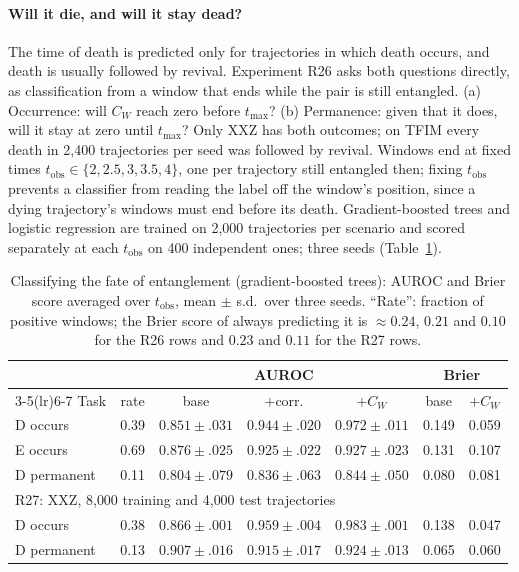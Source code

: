 \documentclass[twocolumn,10pt]{article}
\begin{document}
\paragraph{Will it die, and will it stay dead?}
The time of death is predicted only for trajectories in which death
occurs, and death is usually followed by revival. Experiment R26 asks
both questions directly, as classification from a window that ends while
the pair is still entangled. (a) Occurrence: will $C_W$ reach zero before
$t_\mathrm{max}$? (b) Permanence: given that it does, will it stay at zero
until $t_\mathrm{max}$? Only XXZ has both outcomes; on TFIM every death in
2{,}400 trajectories per seed was followed by revival. Windows end at fixed
times $t_\mathrm{obs} \in \{2, 2.5, 3, 3.5, 4\}$, one per trajectory still
entangled then; fixing $t_\mathrm{obs}$ prevents a classifier from reading
the label off the window's position, since a dying trajectory's windows
must end before its death. Gradient-boosted trees and logistic regression
are trained on 2{,}000 trajectories per scenario and scored separately at
each $t_\mathrm{obs}$ on 400 independent ones; three seeds
(Table~\ref{tab:r26}).

\begin{table}[h]
\centering
\caption{Classifying the fate of entanglement (gradient-boosted trees):
  AUROC and Brier score averaged over $t_\mathrm{obs}$, mean $\pm$ s.d.\
  over three seeds. ``Rate'': fraction of positive windows; the Brier
  score of always predicting it is $\approx 0.24$, $0.21$ and $0.10$ for
  the R26 rows and $0.23$ and $0.11$ for the R27 rows.\label{tab:r26}}
\footnotesize
\setlength{\tabcolsep}{2pt}
\begin{tabular}{lcccccc}
\toprule
 & & \multicolumn{3}{c}{AUROC} & \multicolumn{2}{c}{Brier} \\
\cmidrule(lr){3-5}\cmidrule(lr){6-7}
Task & rate & base & $+$corr. & $+C_W$ & base & $+C_W$ \\
\midrule
D occurs & 0.39 & $0.851 \pm .031$ & $0.944 \pm .020$ & $\mathbf{0.972 \pm .011}$ & 0.149 & 0.059 \\
E occurs & 0.69 & $0.876 \pm .025$ & $\mathbf{0.925 \pm .022}$ & $\mathbf{0.927 \pm .023}$ & 0.131 & 0.107 \\
D permanent & 0.11 & $0.804 \pm .079$ & $0.836 \pm .063$ & $0.844 \pm .050$ & 0.080 & 0.081 \\
\midrule
\multicolumn{7}{l}{R27: XXZ, 8{,}000 training and 4{,}000 test trajectories} \\
D occurs & 0.38 & $0.866 \pm .001$ & $0.959 \pm .004$ & $\mathbf{0.983 \pm .001}$ & 0.138 & 0.047 \\
D permanent & 0.13 & $0.907 \pm .016$ & $0.915 \pm .017$ & $\mathbf{0.924 \pm .013}$ & 0.065 & 0.060 \\
\bottomrule
\end{tabular}
\end{table}
\end{document}
